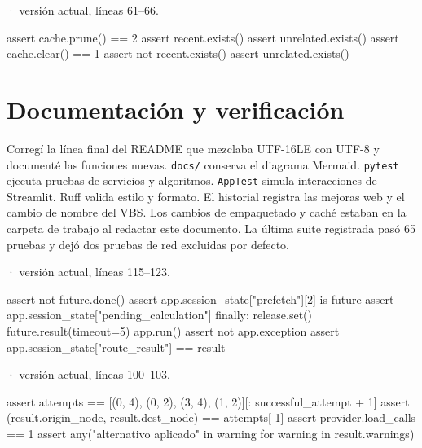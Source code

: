 \documentclass[11pt,a4paper]{article}
\begin{document}
\smallskip
{\footnotesize\texttt{} · versión actual, líneas 61--66.}\par
\begin{Codigo}[firstnumber=61]
    assert cache.prune() == 2
    assert recent.exists()
    assert unrelated.exists()
    assert cache.clear() == 1
    assert not recent.exists()
    assert unrelated.exists()
\end{Codigo}

\section{Documentación y verificación}
Corregí la línea final del README que mezclaba UTF-16LE con UTF-8 y documenté las funciones nuevas. \texttt{docs/} conserva el diagrama Mermaid. \texttt{pytest} ejecuta pruebas de servicios y algoritmos. \texttt{AppTest} simula interacciones de Streamlit. Ruff valida estilo y formato. El historial registra las mejoras web y el cambio de nombre del VBS. Los cambios de empaquetado y caché estaban en la carpeta de trabajo al redactar este documento. La última suite registrada pasó 65 pruebas y dejó dos pruebas de red excluidas por defecto.

\smallskip
{\footnotesize\texttt{} · versión actual, líneas 115--123.}\par
\begin{Codigo}[firstnumber=115]
        assert not future.done()
        assert app.session_state["prefetch"][2] is future
        assert app.session_state["pending_calculation"]
    finally:
        release.set()
    future.result(timeout=5)
    app.run()
    assert not app.exception
    assert app.session_state["route_result"] == result
\end{Codigo}

\smallskip
{\footnotesize\texttt{} · versión actual, líneas 100--103.}\par
\begin{Codigo}[firstnumber=100]
    assert attempts == [(0, 4), (0, 2), (3, 4), (1, 2)][: successful_attempt + 1]
    assert (result.origin_node, result.dest_node) == attempts[-1]
    assert provider.load_calls == 1
    assert any("alternativo aplicado" in warning for warning in result.warnings)
\end{Codigo}
\end{document}
